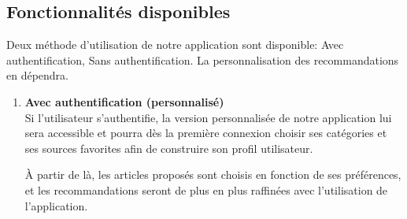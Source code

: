     \subsection{Fonctionnalités disponibles}
    Deux méthode d'utilisation de notre application sont disponible: Avec authentification, Sans authentification. La personnalisation des recommandations en dépendra.
    \begin{enumerate}[leftmargin=*]
        \item\textbf{Avec authentification (personnalisé)}\\
        Si l'utilisateur s'authentifie, la version personnalisée de notre application lui sera accessible et pourra dès la première connexion choisir ses catégories et ses sources favorites afin de construire son profil utilisateur.

        À partir de là, les articles proposés sont choisis en fonction de ses préférences, et les recommandations seront de plus en plus raffinées avec l'utilisation de l'application.


\end{enumerate}
